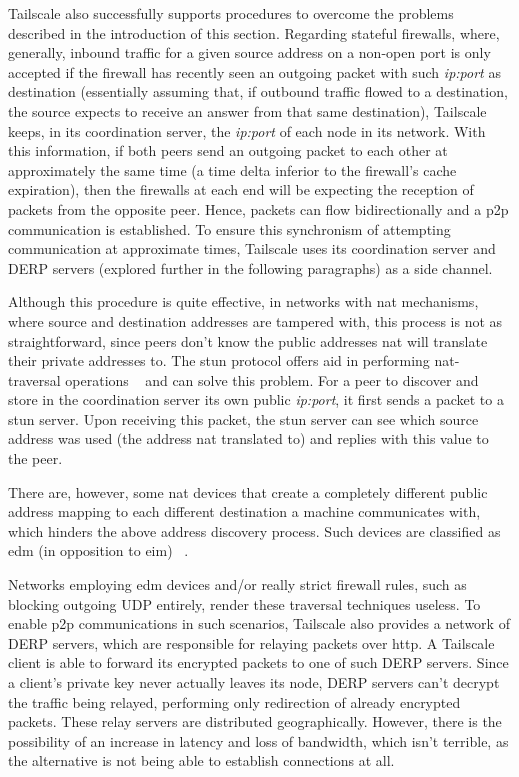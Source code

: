 \documentclass[11pt,twoside,a4paper]{report}
\begin{document}
Tailscale also successfully supports procedures to overcome the problems described in the introduction of this section. Regarding stateful firewalls, where, generally, inbound traffic for a given source address on a non-open port is only accepted if the firewall has recently seen an outgoing packet with such \emph{ip:port} as destination (essentially assuming that, if outbound traffic flowed to a destination, the source expects to receive an answer from that same destination), Tailscale keeps, in its coordination server, the \emph{ip:port} of each node in its network. With this information, if both peers send an outgoing packet to each other at approximately the same time (a time delta inferior to the firewall's cache expiration), then the firewalls at each end will be expecting the reception of packets from the opposite peer. Hence, packets can flow bidirectionally and a \ac{p2p} communication is established. To ensure this synchronism of attempting communication at approximate times, Tailscale uses its coordination server and \ac{DERP} servers (explored further in the following paragraphs) as a side channel.

Although this procedure is quite effective, in networks with \ac{nat} mechanisms, where source and destination addresses are tampered with, this process is not as straightforward, since peers don't know the public addresses \ac{nat} will translate their private addresses to. The \ac{stun} protocol offers aid in performing \ac{nat}-traversal operations ~\cite{rfc8489} and can solve this problem. For a peer to discover and store in the coordination server its own public \emph{ip:port}, it first sends a packet to a \ac{stun} server. Upon receiving this packet, the \ac{stun} server can see which source address was used (the address \ac{nat} translated to) and replies with this value to the peer.

There are, however, some \ac{nat} devices that create a completely different public address mapping to each different destination a machine communicates with, which hinders the above address discovery process. Such devices are classified as \ac{edm} (in opposition to \ac{eim}) ~\cite{rfc4787}.

Networks employing \ac{edm} devices and/or really strict firewall rules, such as blocking outgoing UDP entirely, render these traversal techniques useless. To enable \ac{p2p} communications in such scenarios, Tailscale also provides a network of \ac{DERP} servers, which are responsible for relaying packets over \ac{http}. A Tailscale client is able to forward its encrypted packets to one of such \ac{DERP} servers. Since a client's private key never actually leaves its node, \ac{DERP} servers can't decrypt the traffic being relayed, performing only redirection of already encrypted packets. These relay servers are distributed geographically. However, there is the possibility of an increase in latency and loss of bandwidth, which isn't terrible, as the alternative is not being able to establish connections at all.
\end{document}
